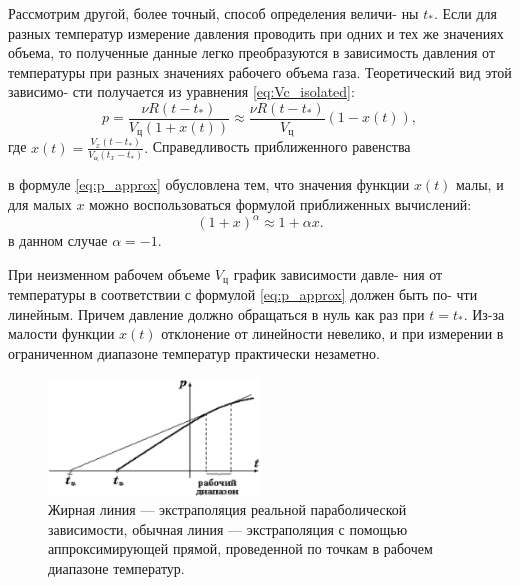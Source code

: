 \documentclass[12pt]{article}
\begin{document}
\vspace{1em} %

Рассмотрим другой, более точный, способ определения величи-
ны $t_{*}$. Если для разных температур измерение давления проводить
при одних и тех же значениях объема, то полученные данные легко
преобразуются в зависимость давления от температуры при разных
значениях рабочего объема газа. Теоретический вид этой зависимо-
сти получается из уравнения \eqref{eq:Vc_isolated}:
\begin{equation} \label{eq:p_approx}
p = \frac{\nu R(t - t_{*})}{V_{\text{ц}}(1 + x(t))} \approx \frac{\nu R(t - t_{*})}{V_{\text{ц}}} (1 - x(t)),
\end{equation}
где $x(t) = \frac{V_x(t - t_{*})}{V_{\text{ц}}(t_{x} - t_{*})}.$ Справедливость приближенного равенства

\vfill

\newpage
\vspace{1em} %

в формуле \eqref{eq:p_approx} обусловлена тем, что значения функции $x(t)$ малы,
и для малых $x$ можно воспользоваться формулой приближенных
вычислений:
\begin{equation} \label{eq:binomial_approx}
(1 + x)^{\alpha} \approx 1 + \alpha x.
\end{equation}
в данном случае $\alpha = -1$.

\vspace{1em}

При неизменном рабочем объеме $V_{\text{ц}}$ график зависимости давле-
ния от температуры в соответствии с формулой \eqref{eq:p_approx} должен быть по-
чти линейным. Причем давление должно обращаться в нуль как раз
при $t = t_{*}$. Из-за малости функции $x(t)$ отклонение от линейности
невелико, и при измерении в ограниченном диапазоне температур
практически незаметно.

\vspace{1em} %

\begin{figure}[H] %
  \centering
  \includegraphics[width=0.5\textwidth]{fig_2.png} %
  \caption{Жирная линия — экстраполяция реальной параболической зависимости, обычная линия — экстраполяция с помощью аппроксимирующей прямой, проведенной по точкам в рабочем диапазоне температур.}
  \label{fig:extrapolation}
\end{figure}
\end{document}
